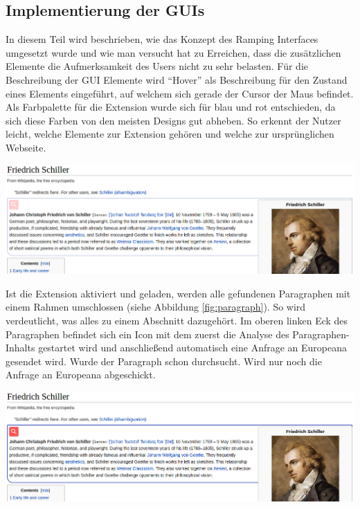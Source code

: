  \subsection{Implementierung der GUIs}
 In diesem Teil wird beschrieben, wie das Konzept des Ramping Interfaces umgesetzt wurde und wie man versucht hat zu Erreichen, dass die zusätzlichen Elemente die Aufmerksamkeit des Users nicht zu sehr belasten. Für die Beschreibung der GUI Elemente wird ``Hover'' als Beschreibung für den Zustand eines Elements eingeführt, auf welchem sich gerade der Cursor der Maus befindet. Als Farbpalette für die Extension wurde sich für blau und rot entschieden, da sich diese Farben von den meisten Designs gut abheben. So erkennt der Nutzer leicht, welche Elemente zur Extension gehören und welche zur ursprünglichen Webseite. 
 
 \begin{minipage}{\linewidth}
	\centering
	\vspace*{0.5cm}
	\includegraphics[width=\linewidth]{Bilder/app-screenshots/paragraph-unhovered.png}
	\label{fig:paragraph}
	\vspace*{0.5cm}
 \end{minipage}

 Ist die Extension aktiviert und geladen, werden alle gefundenen Paragraphen mit einem Rahmen umschlossen (siehe Abbildung \ref{fig:paragraph}). So wird verdeutlicht, was alles zu einem Abschnitt dazugehört. Im oberen linken Eck des Paragraphen befindet sich ein Icon mit dem zuerst die Analyse des Paragraphen-Inhalts gestartet wird und anschließend automatisch eine Anfrage an Europeana gesendet wird. Wurde der Paragraph schon durchsucht. Wird nur noch die Anfrage an Europeana abgeschickt.

 \begin{minipage}{\linewidth}
	\centering
	\vspace*{0.5cm}
	\includegraphics[width=\linewidth]{Bilder/app-screenshots/paragraph-hovered.png}
	\label{fig:paragraphHover}
	\vspace*{0.5cm}
 \end{minipage}

